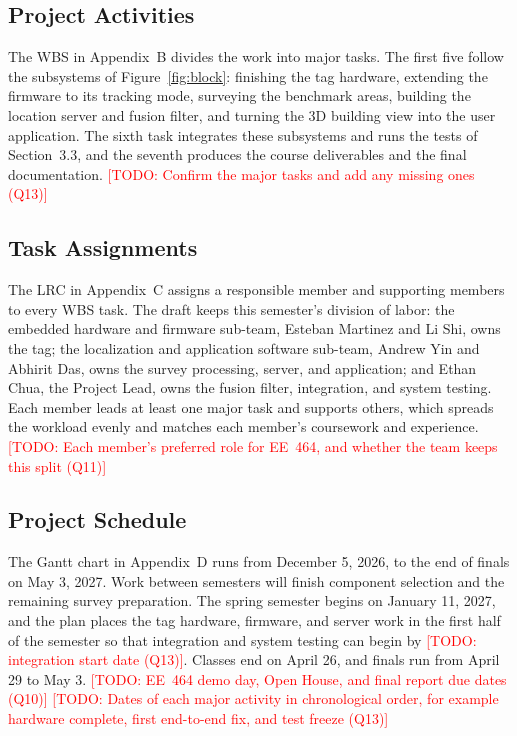 \documentclass[12pt,letterpaper]{article}
\newcommand{\TODO}[1]{\textcolor{red}{[TODO: #1]}}
\begin{document}
\subsection{Project Activities}
The WBS in Appendix~B divides the work into major tasks. The first five follow the subsystems of
Figure~\ref{fig:block}: finishing the tag hardware, extending the firmware to its tracking mode,
surveying the benchmark areas, building the location server and fusion filter, and turning the 3D
building view into the user application. The sixth task integrates these subsystems and runs the
tests of Section~3.3, and the seventh produces the course deliverables and the final documentation.
\TODO{Confirm the major tasks and add any missing ones (Q13)}

\subsection{Task Assignments}
The LRC in Appendix~C assigns a responsible member and supporting members to every WBS task. The
draft keeps this semester's division of labor: the embedded hardware and firmware sub-team, Esteban
Martinez and Li Shi, owns the tag; the localization and application software sub-team, Andrew Yin and
Abhirit Das, owns the survey processing, server, and application; and Ethan Chua, the Project Lead,
owns the fusion filter, integration, and system testing. Each member leads at least one major task
and supports others, which spreads the workload evenly and matches each member's coursework and
experience. \TODO{Each member's preferred role for EE~464, and whether the team keeps this split
(Q11)}

\subsection{Project Schedule}
The Gantt chart in Appendix~D runs from December 5, 2026, to the end of finals on May 3, 2027. Work
between semesters will finish component selection and the remaining survey preparation. The spring
semester begins on January 11, 2027, and the plan places the tag hardware, firmware, and server work
in the first half of the semester so that integration and system testing can begin by
\TODO{integration start date (Q13)}. Classes end on April 26, and finals run from April 29 to May 3.
\TODO{EE~464 demo day, Open House, and final report due dates (Q10)} \TODO{Dates of each major
activity in chronological order, for example hardware complete, first end-to-end fix, and test
freeze (Q13)}
\end{document}

